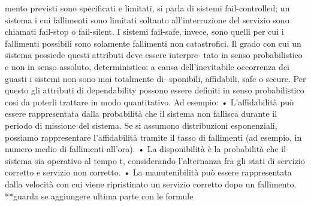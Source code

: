 \documentclass[14pt]{extarticle}
\begin{document}
mento previsti sono specificati e limitati, si parla di sistemi fail-controlled; un
sistema i cui fallimenti sono limitati soltanto all’interruzione del servizio sono
chiamati fail-stop o fail-silent. I sistemi fail-safe, invece, sono quelli per cui i
fallimenti possibili sono solamente fallimenti non catastrofici.
Il grado con cui un sistema possiede questi attributi deve essere interpre-
tato in senso probabilistico e non in senso assoluto, deterministico: a causa
dell’inevitabile occorrenza dei guasti i sistemi non sono mai totalmente di-
sponibili, affidabili, safe o secure. Per questo gli attributi di dependability
possono essere definiti in senso probabilistico cosi da poterli trattare in modo
quantitativo.
Ad esempio:
• L’affidabilità può essere rappresentata dalla probabilità che il sistema
non fallisca durante il periodo di missione del sistema. Se si assumono
distribuzioni esponenziali, possiamo rappresentare l’affidabilità tramite
il tasso di fallimenti (ad esempio, in numero medio di fallimenti all’ora).
• La disponibilità è la probabilità che il sistema sia operativo al tempo t,
considerando l’alternanza fra gli stati di servizio corretto e servizio non
corretto.
• La manutenibilità può essere rappresentata dalla velocità con cui viene
ripristinato un servizio corretto dopo un fallimento.
**guarda se aggiungere ultima parte con le formule
\end{document}
